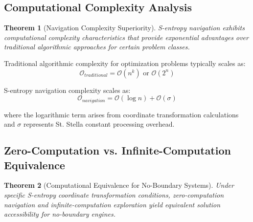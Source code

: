 \documentclass[11pt,a4paper]{article}
\newtheorem{theorem}{Theorem}[section]
\theoremstyle{remark}
\begin{document}
\subsection{Computational Complexity Analysis}

\begin{theorem}[Navigation Complexity Superiority]
S-entropy navigation exhibits computational complexity characteristics that provide exponential advantages over traditional algorithmic approaches for certain problem classes.
\end{theorem}

Traditional algorithmic complexity for optimization problems typically scales as:
\begin{equation}
\mathcal{O}_{traditional} = \mathcal{O}(n^k) \text{ or } \mathcal{O}(2^n)
\end{equation}

S-entropy navigation complexity scales as:
\begin{equation}
\mathcal{O}_{navigation} = \mathcal{O}(\log n) + \mathcal{O}(\sigma)
\label{eq:navigation_complexity}
\end{equation}

where the logarithmic term arises from coordinate transformation calculations and $\sigma$ represents St. Stella constant processing overhead.

\subsection{Zero-Computation vs. Infinite-Computation Equivalence}

\begin{theorem}[Computational Equivalence for No-Boundary Systems]
Under specific S-entropy coordinate transformation conditions, zero-computation navigation and infinite-computation exploration yield equivalent solution accessibility for no-boundary engines.
\end{theorem}
\end{document}
